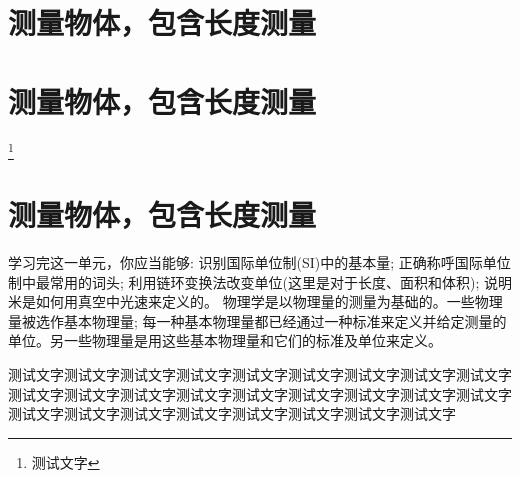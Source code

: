 \section{测量物体，包含长度测量}

\section{测量物体，包含长度测量}
\footnote{测试文字}\lipsum








\section{测量物体，包含长度测量}

\begin{Point*}
	学习完这一单元，你应当能够: 识别国际单位制(SI)中的基本量; 正确称呼国际单位制中最常用的词头; 利用链环变换法改变单位(这里是对于长度、面积和体积); 说明米是如何用真空中光速来定义的。
	\tcblower
	物理学是以物理量的测量为基础的。一些物理量被选作基本物理量; 每一种基本物理量都已经通过一种标准来定义并给定测量的单位。另一些物理量是用这些基本物理量和它们的标准及单位来定义。
%	
%	
%
\end{Point*}

测试文字测试文字测试文字测试文字测试文字测试文字测试文字测试文字测试文字测试文字测试文字测试文字测试文字测试文字测试文字测试文字测试文字测试文字测试文字测试文字测试文字测试文字测试文字测试文字测试文字测试文字



%



